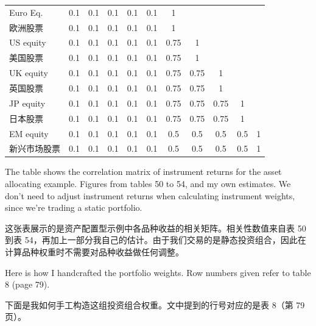 \begin{bilingualtableblock}
{{\begin{tabular}{@{} lcccccccccc@{}}
Euro Eq. & 0.1 & 0.1 & 0.1 & 0.1 & 0.1 & 1 & & & & \\
欧洲股票 & 0.1 & 0.1 & 0.1 & 0.1 & 0.1 & 1 & & & & \\
US equity & 0.1 & 0.1 & 0.1 & 0.1 & 0.1 & 0.75 & 1 & & & \\
美国股票 & 0.1 & 0.1 & 0.1 & 0.1 & 0.1 & 0.75 & 1 & & & \\
UK equity & 0.1 & 0.1 & 0.1 & 0.1 & 0.1 & 0.75 & 0.75 & 1 & & \\
英国股票 & 0.1 & 0.1 & 0.1 & 0.1 & 0.1 & 0.75 & 0.75 & 1 & & \\
JP equity & 0.1 & 0.1 & 0.1 & 0.1 & 0.1 & 0.75 & 0.75 & 0.75 & 1 & \\
日本股票 & 0.1 & 0.1 & 0.1 & 0.1 & 0.1 & 0.75 & 0.75 & 0.75 & 1 & \\
EM equity & 0.1 & 0.1 & 0.1 & 0.1 & 0.1 & 0.5 & 0.5 & 0.5 & 0.5 & 1 \\
新兴市场股票 & 0.1 & 0.1 & 0.1 & 0.1 & 0.1 & 0.5 & 0.5 & 0.5 & 0.5 & 1 \\
\bottomrule
\end{tabular}%
}}\endgroup \end{bilingualtableblock}

\begin{englishblock} The table shows the correlation matrix of instrument returns for the asset allocating example. Figures from tables 50 to 54, and my own estimates. We don’t need to adjust instrument returns when calculating instrument weights, since we’re trading a static portfolio. \end{englishblock}

\begin{chineseblock}这张表展示的是资产配置型示例中各品种收益的相关矩阵。相关性数值来自表 50 到表 54，再加上一部分我自己的估计。由于我们交易的是静态投资组合，因此在计算品种权重时不需要对品种收益做任何调整。\end{chineseblock}

\bipairgap

\begin{englishblock} Here is how I handcrafted the portfolio weights. Row numbers given refer to table 8 (page 79). \end{englishblock}

\begin{chineseblock}下面是我如何手工构造这组投资组合权重。文中提到的行号对应的是表 8（第 79 页）。\end{chineseblock}

